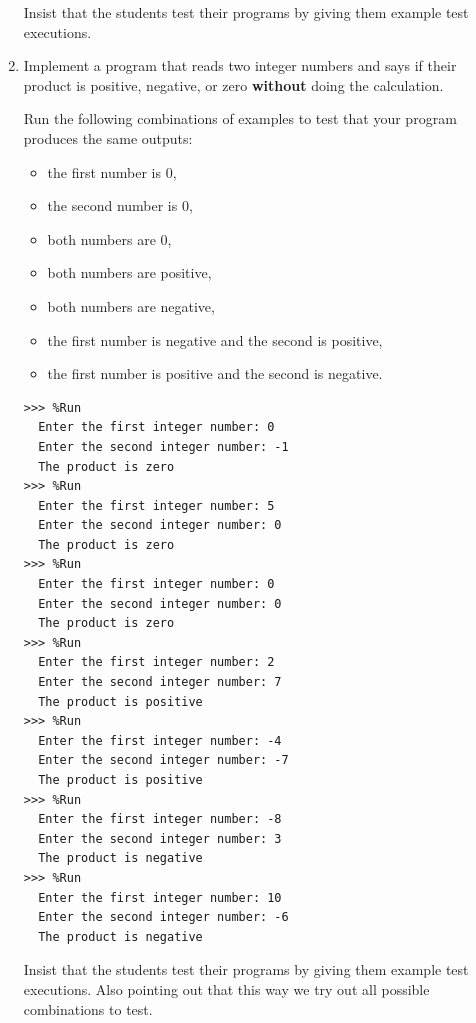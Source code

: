 \documentclass[
  fontsize=10pt,
  a4paper,
]{scrartcl}
\newenvironment{howTILEd}%
  {\begin{mdframed}[skipabove=10pt,skipbelow=10pt,backgroundcolor=pink!40]}%
  {\end{mdframed}}
\begin{document}
\begin{enumerate}
\begin{howTILEd}
Insist that the students test their programs by giving them example test executions.
\end{howTILEd}

\item Implement a program that reads two integer numbers and says if their product is positive, negative, or zero \textbf{without} doing the calculation.

Run the following combinations of examples to test that your program produces the same outputs: 
\begin{itemize}
\item the first number is 0, 
\item the second number is 0, 
\item both numbers are 0, 
\item both numbers are positive, 
\item both numbers are negative, 
\item the first number is negative and the second is positive, 
\item the first number is positive and the second is negative.
\end{itemize}

\begin{small}
\begin{Verbatim}[frame=single, label={\em examples of test executions}]
>>> %Run
  Enter the first integer number: 0
  Enter the second integer number: -1
  The product is zero
>>> %Run 
  Enter the first integer number: 5
  Enter the second integer number: 0
  The product is zero
>>> %Run 
  Enter the first integer number: 0
  Enter the second integer number: 0
  The product is zero
>>> %Run 
  Enter the first integer number: 2
  Enter the second integer number: 7
  The product is positive
>>> %Run 
  Enter the first integer number: -4
  Enter the second integer number: -7
  The product is positive
>>> %Run 
  Enter the first integer number: -8
  Enter the second integer number: 3
  The product is negative
>>> %Run 
  Enter the first integer number: 10
  Enter the second integer number: -6
  The product is negative
\end{Verbatim}
\end{small}

\begin{howTILEd}
Insist that the students test their programs by giving them example test executions. Also pointing out that this way we try out all possible combinations to test.
\end{howTILEd}



\end{enumerate}
\end{document}
